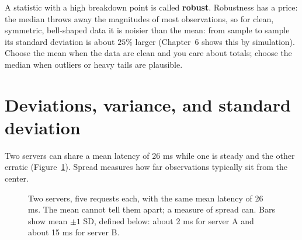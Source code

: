 A statistic with a high breakdown point is called \textbf{robust}. Robustness has a
price: the median throws away the magnitudes of most observations, so for clean,
symmetric, bell-shaped data it is noisier than the mean: from sample to sample its
standard deviation is about $25\%$ larger (Chapter~6 shows this by simulation). Choose the mean when
the data are clean and you care about totals; choose the median when outliers or
heavy tails are plausible.

\section{Deviations, variance, and standard deviation}
\label{sec:center-spread-variance}

Two servers can share a mean latency of 26 ms while one is steady and the other
erratic (Figure~\ref{fig:center-spread-two-servers}). Spread measures how far
observations typically sit from the center.

\begin{figure}[H]
\centering
{}
\caption{Two servers, five requests each, with the same mean latency of 26 ms. The
mean cannot tell them apart; a measure of spread can. Bars show mean $\pm 1$ SD,
defined below: about 2 ms for server A and about 15 ms for server B.}
\label{fig:center-spread-two-servers}
\end{figure}


